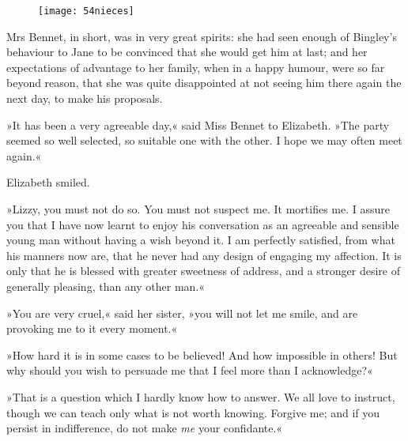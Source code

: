 \begin{figure}[tbh]
\centering
\texttt{[image: 54nieces]}
\end{figure}

Mrs Bennet, in short, was in very great spirits: she had seen enough of Bingley's behaviour to Jane to be convinced that she would get him at last; and her expectations of advantage to her family, when in a happy humour, were so far beyond reason, that she was quite disappointed at not seeing him there again the next day, to make his proposals.

»It has been a very agreeable day,« said Miss Bennet to Elizabeth. »The party seemed so well selected, so suitable one with the other. I hope we may often meet again.«

Elizabeth smiled.

»Lizzy, you must not do so. You must not suspect me. It mortifies me. I assure you that I have now learnt to enjoy his conversation as an agreeable and sensible young man without having a wish beyond it. I am perfectly satisfied, from what his manners now are, that he never had any design of engaging my affection. It is only that he is blessed with greater sweetness of address, and a stronger desire of generally pleasing, than any other man.«

»You are very cruel,« said her sister, »you will not let me smile, and are provoking me to it every moment.«

»How hard it is in some cases to be believed! And how impossible in others! But why should you wish to persuade me that I feel more than I acknowledge?«

»That is a question which I hardly know how to answer. We all love to instruct, though we can teach only what is not worth knowing. Forgive me; and if you persist in indifference, do not make \textit{me} your confidante.«